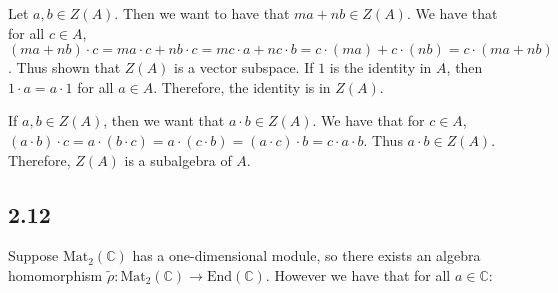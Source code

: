 \documentclass[]{article}
\begin{document}
Let $a, b \in Z(A)$. Then we want to have that $ma + nb \in Z(A)$. We have that for all $c \in A$, $(ma + nb) \cdot c = ma \cdot c + nb \cdot c = m c \cdot a + n c \cdot b = c \cdot (ma) + c \cdot (nb) = c \cdot (ma + nb)$. Thus shown that $Z(A)$ is a vector subspace.
If $1$ is the identity in $A$, then $1 \cdot a = a \cdot 1$ for all $a \in A$. Therefore, the identity is in $Z(A)$.

If $a, b \in Z(A)$, then we want that $a \cdot b \in Z(A)$. We have that for $c \in A$, $(a \cdot b) \cdot c = a \cdot ( b \cdot c) = a \cdot (c \cdot b) = (a \cdot c) \cdot b = c \cdot a \cdot b$. Thus $a \cdot b \in Z(A)$. 
Therefore, $Z(A)$ is a subalgebra of $A$. 

\subsection*{2.12}
Suppose $\text{Mat}_2(\mathbb{C})$ has a one-dimensional module, so there exists an algebra homomorphism $\tilde{\rho} : \text{Mat}_2(\mathbb{C}) \rightarrow \text{End}(\mathbb{C})$. However we have that for all $a \in \mathbb{C}$:
\end{document}
